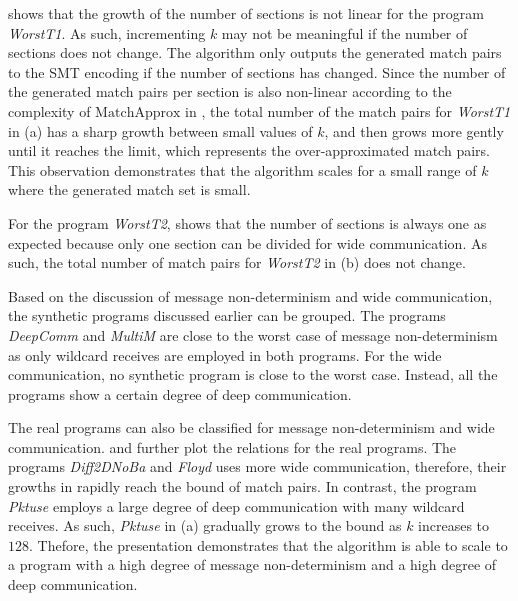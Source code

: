  shows that the growth of the number of sections is not linear for the program \textit{WorstT1}. As such, incrementing $k$ may not be meaningful if the number of sections does not change. The algorithm only outputs the generated match pairs to the SMT encoding if the number of sections has changed.
Since the number of the generated match pairs per section is also non-linear according to the complexity of $\mathrm{MatchApprox}$ in , the total number of the match pairs for \textit{WorstT1} in  (a) has a sharp growth between small values of $k$, and then grows more gently until it reaches the limit, which represents the over-approximated match pairs. This observation demonstrates that the algorithm scales for a small range of $k$ where the generated match set is small.


For the program \textit{WorstT2},  shows that the number of sections is always one as expected because only one section can be divided for wide communication. 
As such, the total number of match pairs for \textit{WorstT2} in  (b) does not change. 

Based on the discussion of message non-determinism and wide communication, the synthetic programs discussed earlier can be grouped. The programs \textit{DeepComm} and \textit{MultiM} are close to the worst case of message non-determinism as only wildcard receives are employed in both programs. For the wide communication, no synthetic program is close to the worst case. Instead, all the programs show a certain degree of deep communication. 

The real programs can also be classified for message non-determinism and wide communication.  and  further plot the relations for the real programs. 
The programs \textit{Diff2DNoBa} and \textit{Floyd} uses more wide communication, therefore, their growths in  rapidly reach the bound of match pairs. In contrast, the program \textit{Pktuse} employs a large degree of deep communication with many wildcard receives. As such, \textit{Pktuse} in  (a) gradually grows to the bound as $k$ increases to $128$.
Thefore, the presentation demonstrates that the algorithm is able to scale to a program with a high degree of message non-determinism and a high degree of deep communication.



